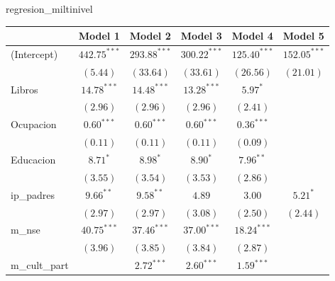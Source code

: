 \documentclass[
]{article}
\newenvironment{Shaded}{\begin{snugshade}}{\end{snugshade}}
\newcommand{\NormalTok}[1]{#1}
\begin{document}
\begin{Shaded}
\begin{Highlighting}[]
\NormalTok{regresion_miltinivel}
\end{Highlighting}
\end{Shaded}

\begin{table}
\begin{center}
\begin{tabular}{l c c c c c}
\hline
 & Model 1 & Model 2 & Model 3 & Model 4 & Model 5 \\
\hline
(Intercept)                      & $442.75^{***}$ & $293.88^{***}$ & $300.22^{***}$ & $125.40^{***}$ & $152.05^{***}$ \\
                                 & $(5.44)$       & $(33.64)$      & $(33.61)$      & $(26.56)$      & $(21.01)$      \\
Libros                           & $14.78^{***}$  & $14.48^{***}$  & $13.28^{***}$  & $5.97^{*}$     &                \\
                                 & $(2.96)$       & $(2.96)$       & $(2.96)$       & $(2.41)$       &                \\
Ocupacion                        & $0.60^{***}$   & $0.60^{***}$   & $0.60^{***}$   & $0.36^{***}$   &                \\
                                 & $(0.11)$       & $(0.11)$       & $(0.11)$       & $(0.09)$       &                \\
Educacion                        & $8.71^{*}$     & $8.98^{*}$     & $8.90^{*}$     & $7.96^{**}$    &                \\
                                 & $(3.55)$       & $(3.54)$       & $(3.53)$       & $(2.86)$       &                \\
ip\_padres                       & $9.66^{**}$    & $9.58^{**}$    & $4.89$         & $3.00$         & $5.21^{*}$     \\
                                 & $(2.97)$       & $(2.97)$       & $(3.08)$       & $(2.50)$       & $(2.44)$       \\
m\_nse                           & $40.75^{***}$  & $37.46^{***}$  & $37.00^{***}$  & $18.24^{***}$  &                \\
                                 & $(3.96)$       & $(3.85)$       & $(3.84)$       & $(2.87)$       &                \\
m\_cult\_part                    &                & $2.72^{***}$   & $2.60^{***}$   & $1.59^{***}$   &                \\

\end{tabular}
\end{center}
\end{table}
\end{document}
